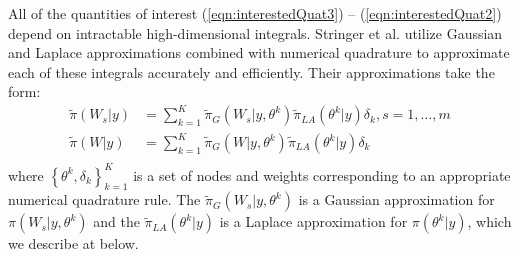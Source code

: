 \documentclass[serif,10pt]{wiley-article}
\begin{document}
All of the quantities of interest (\ref{eqn:interestedQuat3}) -- (\ref{eqn:interestedQuat2}) depend on intractable high-dimensional integrals. Stringer et al. \cite{casecross} utilize Gaussian and Laplace approximations combined with numerical quadrature to approximate each of these integrals accurately and efficiently. Their approximations take the form:
\begin{equation}\begin{aligned}\label{eqn:integration}
\tilde{\pi}(W_{s}|y) &= \sum_{k=1}^{K}
\tilde{\pi}_{G}(W_{s}|y,\theta^{k})
\tilde{\pi}_{LA}(\theta^{k}|y)\delta_{k}, s = 1,\ldots,m \\
\tilde{\pi}(W|y) &= \sum_{k=1}^{K}
\tilde{\pi}_{G}(W|y,\theta^{k})
\tilde{\pi}_{LA}(\theta^{k}|y)\delta_{k} \\
\end{aligned}\end{equation}
where $\left\{\theta^{k},\delta_{k}\right\}_{k=1}^{K}$ is a set of nodes and weights corresponding to an appropriate numerical quadrature rule. The $\tilde{\pi}_{G}(W_{s}|y,\theta^{k})$ is a Gaussian approximation for $\pi(W_{s}|y,\theta^{k})$ and the $\tilde{\pi}_{LA}(\theta^{k}|y)$ is a Laplace approximation for $\pi(\theta^{k}|y)$, which we describe at below.
\end{document}
